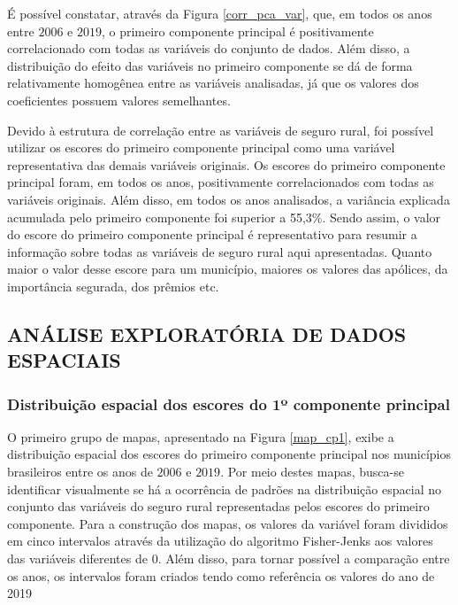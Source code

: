É possível constatar, através da Figura \ref{corr_pca_var}, que, em todos os anos entre $2006$ e $2019$, o primeiro componente principal é positivamente correlacionado com todas as variáveis do conjunto de dados. Além disso, a distribuição do efeito das variáveis no primeiro componente se dá de forma relativamente homogênea entre as variáveis analisadas, já que os valores dos coeficientes possuem valores semelhantes. 

Devido à estrutura de correlação entre as variáveis de seguro rural, foi possível utilizar os escores do primeiro componente principal como uma variável representativa das demais variáveis originais. Os escores do primeiro componente principal foram, em todos os anos, positivamente correlacionados com todas as variáveis originais. Além disso, em todos os anos analisados, a variância explicada acumulada pelo primeiro componente foi superior a 55,3\%. Sendo assim, o valor do escore do primeiro componente principal é representativo para resumir a informação sobre todas as variáveis de seguro rural aqui apresentadas. Quanto maior o valor desse escore para um município, maiores os valores das apólices, da importância segurada, dos prêmios etc.


\subsection{ANÁLISE EXPLORATÓRIA DE DADOS ESPACIAIS}

\subsubsection{Distribuição espacial dos escores do 1º componente principal}

O primeiro grupo de mapas, apresentado na Figura \ref{map_cp1}, exibe a distribuição espacial dos escores do primeiro componente principal nos municípios brasileiros entre os anos de $2006$ e $2019$. Por meio destes mapas, busca-se identificar visualmente se há a ocorrência de padrões na distribuição espacial no conjunto das variáveis do seguro rural representadas pelos escores do primeiro componente. Para a construção dos mapas, os valores da variável foram divididos em cinco intervalos através da utilização do algoritmo Fisher-Jenks aos valores das variáveis diferentes de $0$. Além disso, para tornar possível a comparação entre os anos, os intervalos foram criados tendo como referência os valores do ano de 2019 \cite{jenks77_2}


